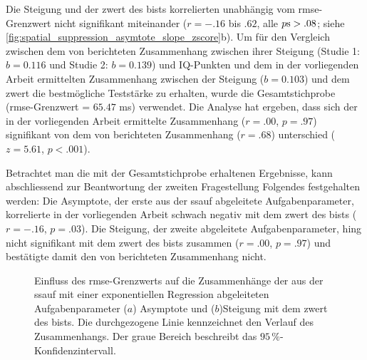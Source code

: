 \documentclass[11pt, twoside, a4paper]{book}		%
\begin{document}
Die Steigung und der \gls{zwert} des \gls{bist}s korrelierten unabhängig vom \gls{rmse}-Grenzwert nicht signifikant miteinander ($r=-.16$ bis $.62$, alle $p\textnormal{s}>.08$; siehe \autoref{fig:spatial_suppression_asymtote_slope_zscore}b). 
Um für den Vergleich zwischen dem von \citet{Melnick2013} berichteten Zusammenhang zwischen ihrer Steigung (Studie 1: $b=0.116$ und Studie 2: $b=0.139$) und IQ-Punkten und dem in der vorliegenden Arbeit ermittelten Zusammenhang zwischen der Steigung ($b=0.103$) und dem \gls{zwert} die bestmögliche Teststärke zu erhalten, wurde die Gesamtstichprobe (\gls{rmse}-Grenzwert = $65.47$ ms) verwendet. Die Analyse hat ergeben, dass sich der in der vorliegenden Arbeit ermittelte Zusammenhang ($r=.00$, $p=.97$) signifikant von dem von \citeauthor{Melnick2013} berichteten Zusammenhang ($r=.68$) unterschied ($z=5.61$, $p<.001$).

Betrachtet man die mit der Gesamtstichprobe erhaltenen Ergebnisse, kann abschliessend zur Beantwortung der zweiten Fragestellung Folgendes festgehalten werden:  
Die Asymptote, der erste aus der \gls{ssauf} abgeleitete Aufgabenparameter, korrelierte in der vorliegenden Arbeit schwach negativ mit dem \gls{zwert} des \gls{bist}s ($r=-.16$, $p=.03$). Die Steigung, der zweite abgeleitete Aufgabenparameter, hing nicht signifikant mit dem \gls{zwert} des \gls{bist}s zusammen ($r=.00$, $p=.97$) und bestätigte damit den von \citet{Melnick2013} berichteten Zusammenhang nicht. 

\begin{figure}[htbp]
	\centering
	\begin{adjustbox}{width=1\textwidth}
	\end{adjustbox}
	\newline
	\begin{adjustbox}{width=1\textwidth}
	\end{adjustbox}
	
	\caption[Einfluss des \gls{rmse}-Grenzwerts der \gls{ssauf} auf den Zusammenhang zwischen der Asymptote, der Steigung und dem \gls{zwert} des \gls{bist}s]{Einfluss des \gls{rmse}-Grenzwerts auf die Zusammenhänge der aus der \gls{ssauf} mit einer exponentiellen Regression abgeleiteten Aufgabenparameter ($a$) Asymptote  und ($b$)Steigung  mit dem \gls{zwert} des \gls{bist}s. Die durchgezogene Linie kennzeichnet den Verlauf des Zusammenhangs. Der graue Bereich beschreibt das $95\,\%$-Konfidenzintervall.}
	\label{fig:spatial_suppression_asymtote_slope_zscore}
\end{figure}
\end{document}
